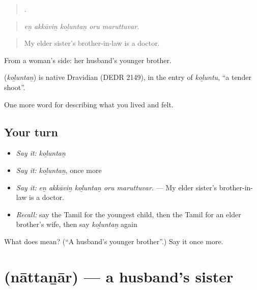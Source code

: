 \begin{quote}
    .
\end{quote}

\begin{quote}
\emph{eṉ akkāviṉ koḻuntaṉ oru maruttuvar.}
\end{quote}

\begin{quote}
My elder sister’s brother-in-law is a doctor.
\end{quote}

From a woman’s side: her husband’s younger brother.

\begin{cousinweb}
\textbf{} (\emph{koḻuntaṉ}) is native Dravidian (DEDR 2149), in the entry of  \emph{koḻuntu}, \textquotedblleft{}a tender shoot\textquotedblright{}.
\end{cousinweb}

\begin{grammarlens}[title={What you've built}]
One more word for describing what you lived and felt.
\end{grammarlens}

\subsection*{Your turn}
\begin{itemize}
\raggedright
  \item \emph{Say it:} \emph{koḻuntaṉ}
  \item \emph{Say it:} \emph{koḻuntaṉ}, once more
  \item \emph{Say it:} \emph{eṉ akkāviṉ koḻuntaṉ oru maruttuvar.} — My elder sister’s brother-in-law is a doctor.
  \item \emph{Recall:} say the Tamil for the youngest child, then the Tamil for an elder brother’s wife, then say \emph{koḻuntaṉ} again
\end{itemize}

\begin{tcolorbox}[breakable,colback=teal!4,colframe=teal!35!black,title={Before you move on}]
What does  mean? (\textquotedblleft{}A husband’s younger brother\textquotedblright{}.) Say it once more.
\end{tcolorbox}
\section[\texorpdfstring{\ta{நாத்தனார்} (nāttaṉār)}{நாத்தனார் (nāttaṉār)}]{ (nāttaṉār) — a husband’s sister}

